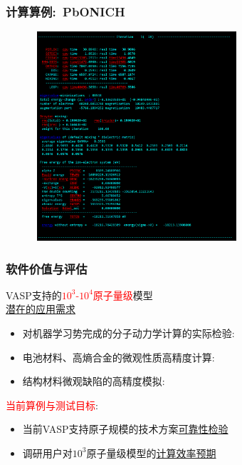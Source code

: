\begin{frame}
	\frametitle{计算算例:~\textrm{PbONICH}}
\begin{figure}[h!]
\centering
\vskip -0.21in
\includegraphics[height=3.05in,width=3.00in,viewport=0 0 1000 1152,clip]{Figures/VASP_huge_Ningde-PbONICH_OUTCAR.png}
\label{VASP_Model-3}
\end{figure} 
\end{frame}

\frame
{
	\frametitle{软件价值与评估}
\textrm{VASP}支持的\textcolor{red}{$10^3$-$10^4$原子量级}模型\\
\underline{潜在的应用需求}
\begin{itemize}
		\setlength{\itemsep}{10pt}
		\item 	对机器学习势完成的分子动力学计算的实际检验:\\
			{\fontsize{7.2pt}{5.2pt}\selectfont{是否可以彻底摆脱对第一原理大规模计算的约束}}
		\item 电池材料、高熵合金的微观性质高精度计算:\\
			{\fontsize{7.2pt}{5.2pt}\selectfont{高精度的应用级模拟}}
		\item 结构材料微观缺陷的高精度模拟:\\
			{\fontsize{7.2pt}{5.2pt}\selectfont{高精度的材料可观测实验组数据对照}}
	\end{itemize}
	\vskip 5pt
	\textcolor{red}{当前算例与测试目标}:~
	\begin{itemize}
		\item 当前\textrm{VASP}支持原子规模的技术方案\underline{可靠性检验}
		\item 调研用户对$10^3$原子量级模型的\underline{计算效率预期}
	\end{itemize}
}

